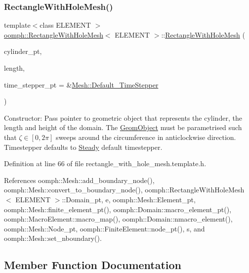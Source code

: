 \subsubsection{\texorpdfstring{Rectangle\+With\+Hole\+Mesh()}{RectangleWithHoleMesh()}}
{\footnotesize\ttfamily template$<$class E\+L\+E\+M\+E\+NT $>$ \\
\hyperlink{classoomph_1_1RectangleWithHoleMesh}{oomph\+::\+Rectangle\+With\+Hole\+Mesh}$<$ E\+L\+E\+M\+E\+NT $>$\+::\hyperlink{classoomph_1_1RectangleWithHoleMesh}{Rectangle\+With\+Hole\+Mesh} (\begin{DoxyParamCaption}\item[{\hyperlink{classoomph_1_1GeomObject}{Geom\+Object} $\ast$}]{cylinder\+\_\+pt,  }\item[{const double \&}]{length,  }\item[{\hyperlink{classoomph_1_1TimeStepper}{Time\+Stepper} $\ast$}]{time\+\_\+stepper\+\_\+pt = {\ttfamily \&\hyperlink{classoomph_1_1Mesh_a12243d0fee2b1fcee729ee5a4777ea10}{Mesh\+::\+Default\+\_\+\+Time\+Stepper}} }\end{DoxyParamCaption})\hspace{0.3cm}{\ttfamily [inline]}}



Constructor\+: Pass pointer to geometric object that represents the cylinder, the length and height of the domain. The \hyperlink{classoomph_1_1GeomObject}{Geom\+Object} must be parametrised such that $\zeta \in [0,2\pi]$ sweeps around the circumference in anticlockwise direction. Timestepper defaults to \hyperlink{classoomph_1_1Steady}{Steady} default timestepper. 



Definition at line 66 of file rectangle\+\_\+with\+\_\+hole\+\_\+mesh.\+template.\+h.



References oomph\+::\+Mesh\+::add\+\_\+boundary\+\_\+node(), oomph\+::\+Mesh\+::convert\+\_\+to\+\_\+boundary\+\_\+node(), oomph\+::\+Rectangle\+With\+Hole\+Mesh$<$ E\+L\+E\+M\+E\+N\+T $>$\+::\+Domain\+\_\+pt, e, oomph\+::\+Mesh\+::\+Element\+\_\+pt, oomph\+::\+Mesh\+::finite\+\_\+element\+\_\+pt(), oomph\+::\+Domain\+::macro\+\_\+element\+\_\+pt(), oomph\+::\+Macro\+Element\+::macro\+\_\+map(), oomph\+::\+Domain\+::nmacro\+\_\+element(), oomph\+::\+Mesh\+::\+Node\+\_\+pt, oomph\+::\+Finite\+Element\+::node\+\_\+pt(), s, and oomph\+::\+Mesh\+::set\+\_\+nboundary().



\subsection{Member Function Documentation}
\mbox{\label{classoomph_1_1RectangleWithHoleMesh_a800865b6bb11c07a505245967c0febd0}} 
